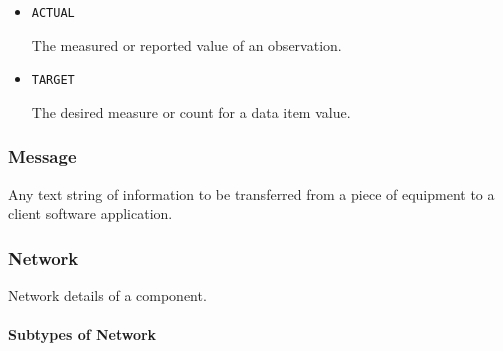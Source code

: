 \begin{itemize}

\item \texttt{ACTUAL}


The measured or reported value of an \gls{observation}.

\item \texttt{TARGET}


The desired measure or count for a data item value.


\end{itemize}





\subsubsection{Message}
\label{sec:Message}



Any text string of information to be transferred from a piece of equipment to a client software application.



\subsubsection{Network}
\label{sec:Network}



Network details of a component.


\paragraph{Subtypes of Network}\mbox{}
\label{sec:Subtypes of Network}

